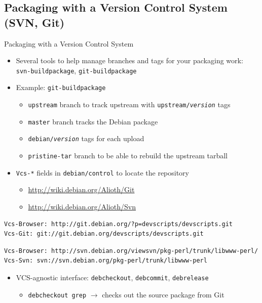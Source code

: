 \documentclass[10pt,final]{beamer}
\begin{document}
\subsection{Packaging with a Version Control System (SVN, Git)}
\begin{frame}[fragile]{Packaging with a Version Control System}
  \begin{itemize}
  \item Several tools to help manage branches and tags for your packaging work:\\
    \texttt{svn-buildpackage}, \texttt{git-buildpackage}
    \hbr
  \item Example: \texttt{git-buildpackage}
    \begin{itemize}
    \item \texttt{upstream} branch to track upstream with \texttt{upstream/\textsl{version}} tags
    \item \texttt{master} branch tracks the Debian package
    \item \texttt{debian/\textsl{version}} tags for each upload
    \item \texttt{pristine-tar} branch to be able to rebuild the upstream tarball
    \end{itemize}
    \hbr
  \item \texttt{Vcs-*} fields in \texttt{debian/control} to locate the repository
	  \begin{itemize}
		\item \url{http://wiki.debian.org/Alioth/Git}
		\item \url{http://wiki.debian.org/Alioth/Svn}
	\end{itemize}
\end{itemize}
  \begin{lstlisting}[basicstyle=\ttfamily\footnotesize]
Vcs-Browser: http://git.debian.org/?p=devscripts/devscripts.git
Vcs-Git: git://git.debian.org/devscripts/devscripts.git
  \end{lstlisting}
  \begin{lstlisting}[basicstyle=\ttfamily\footnotesize]
Vcs-Browser: http://svn.debian.org/viewsvn/pkg-perl/trunk/libwww-perl/
Vcs-Svn: svn://svn.debian.org/pkg-perl/trunk/libwww-perl
  \end{lstlisting}
  \begin{itemize}
  \item VCS-agnostic interface: \texttt{debcheckout}, \texttt{debcommit},
    \texttt{debrelease}\\
    \begin{itemize}
	    \item     \texttt{debcheckout grep} $\rightarrow$ checks out the source package
    from Git
    \end{itemize}
\end{itemize}
\end{frame}
\end{document}
